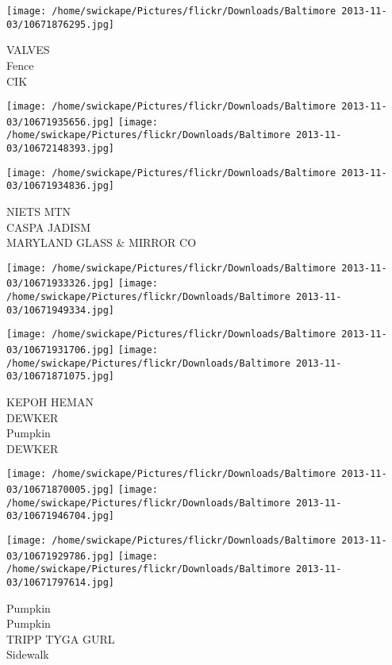 \documentclass[10pt,letterpaper]{article}
\begin{document}
\vspace{0.25in}
\texttt{[image: /home/swickape/Pictures/flickr/Downloads/Baltimore 2013-11-03/10671876295.jpg]}

VALVES\\
Fence\\
CIK\\
\pagebreak

\texttt{[image: /home/swickape/Pictures/flickr/Downloads/Baltimore 2013-11-03/10671935656.jpg]}
\texttt{[image: /home/swickape/Pictures/flickr/Downloads/Baltimore 2013-11-03/10672148393.jpg]}

\vspace{0.25in}
\texttt{[image: /home/swickape/Pictures/flickr/Downloads/Baltimore 2013-11-03/10671934836.jpg]}

NIETS MTN\\
CASPA JADISM\\
MARYLAND GLASS \& MIRROR CO\\
\pagebreak

\texttt{[image: /home/swickape/Pictures/flickr/Downloads/Baltimore 2013-11-03/10671933326.jpg]}
\texttt{[image: /home/swickape/Pictures/flickr/Downloads/Baltimore 2013-11-03/10671949334.jpg]}

\texttt{[image: /home/swickape/Pictures/flickr/Downloads/Baltimore 2013-11-03/10671931706.jpg]}
\texttt{[image: /home/swickape/Pictures/flickr/Downloads/Baltimore 2013-11-03/10671871075.jpg]}

KEPOH HEMAN\\
DEWKER\\
Pumpkin\\
DEWKER\\
\pagebreak

\texttt{[image: /home/swickape/Pictures/flickr/Downloads/Baltimore 2013-11-03/10671870005.jpg]}
\texttt{[image: /home/swickape/Pictures/flickr/Downloads/Baltimore 2013-11-03/10671946704.jpg]}

\texttt{[image: /home/swickape/Pictures/flickr/Downloads/Baltimore 2013-11-03/10671929786.jpg]}
\texttt{[image: /home/swickape/Pictures/flickr/Downloads/Baltimore 2013-11-03/10671797614.jpg]}

Pumpkin\\
Pumpkin\\
TRIPP TYGA GURL\\
Sidewalk\\
\pagebreak
\end{document}
